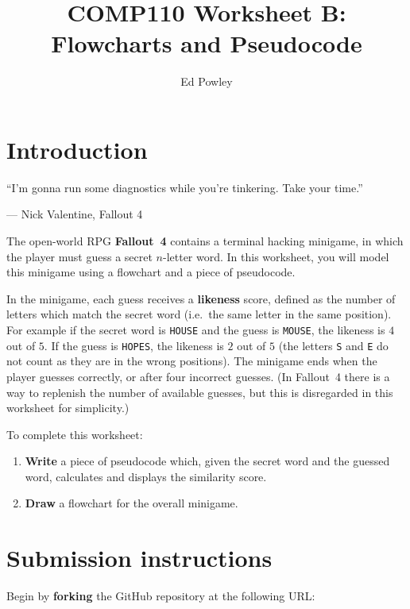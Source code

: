 \documentclass{../../../fal_assignment}
\title{COMP110 Worksheet B: Flowcharts and Pseudocode}
\author{Ed Powley}
\begin{document}
\maketitle

\section*{Introduction}

\begin{marginquote}
``I'm gonna run some diagnostics while you're tinkering. Take your time.''

--- Nick Valentine, Fallout 4
\end{marginquote}

The open-world RPG \textbf{Fallout~4} contains a terminal hacking minigame, in which
the player must guess a secret $n$-letter word.
In this worksheet, you will model this minigame using a flowchart and a piece of pseudocode.

In the minigame, each guess receives a \textbf{likeness} score,
defined as the number of letters which match the secret word (i.e.\ the same letter in the same position).
For example if the secret word is \texttt{HOUSE} and the guess is \texttt{MOUSE}, the likeness is $4$ out of $5$.
If the guess is \texttt{HOPES}, the likeness is $2$ out of $5$
(the letters \texttt{S} and \texttt{E} do not count as they are in the wrong positions).
The minigame ends when the player guesses correctly, or after four incorrect guesses.
(In Fallout~4 there is a way to replenish the number of available guesses,
but this is disregarded in this worksheet for simplicity.)

To complete this worksheet:
\begin{enumerate}[label=(\alph*)]
	\item \textbf{Write} a piece of pseudocode which, given the secret word and the guessed word,
		calculates and displays the similarity score.
	\item \textbf{Draw} a flowchart for the overall minigame.
\end{enumerate}

\section*{Submission instructions}

Begin by \textbf{forking} the GitHub repository at the following URL:
\end{document}
